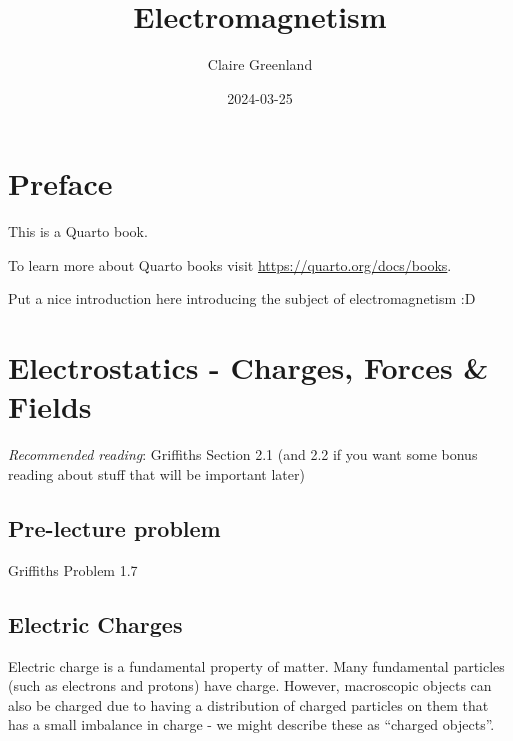 \documentclass[
  letterpaper,
  DIV=11,
  numbers=noendperiod]{scrreprt}
\title{Electromagnetism}
\author{Claire Greenland}
\date{2024-03-25}
\renewcommand*\contentsname{Table of contents}
\newcommand\contentsname{Table of contents}
\begin{document}
\maketitle

\renewcommand*\contentsname{Table of contents}
{
\hypersetup{linkcolor=}
\setcounter{tocdepth}{2}
\tableofcontents
}

\chapter*{Preface}\label{preface}


This is a Quarto book.

To learn more about Quarto books visit
\url{https://quarto.org/docs/books}.

Put a nice introduction here introducing the subject of electromagnetism
:D


\chapter{Electrostatics - Charges, Forces \&
Fields}\label{electrostatics---charges-forces-fields}

\newcommand{\E}{\mathrm{\mathbf{E}}}
\newcommand{\F}{\mathrm{\mathbf{F}}}
\newcommand{\r}{\mathrm{\mathbf{r}}}

\emph{Recommended reading}: Griffiths Section 2.1 (and 2.2 if you want
some bonus reading about stuff that will be important later)

\section{Pre-lecture problem}\label{pre-lecture-problem}

Griffiths Problem 1.7

\section{Electric Charges}\label{electric-charges}

Electric charge is a fundamental property of matter. Many fundamental
particles (such as electrons and protons) have charge. However,
macroscopic objects can also be charged due to having a distribution of
charged particles on them that has a small imbalance in charge - we
might describe these as ``charged objects''.
\end{document}
